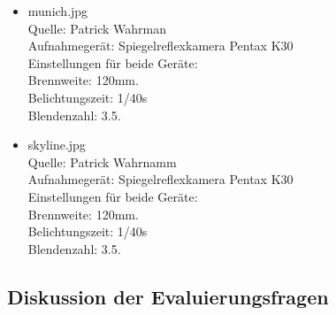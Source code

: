 \documentclass[deutsch]{scrartcl}
\begin{document}
\begin{itemize}
	\item munich.jpg\\
		Quelle: Patrick Wahrman\\
		Aufnahmegerät: Spiegelreflexkamera Pentax K30 \\
		Einstellungen für beide Geräte: \\
		Brennweite: 120mm. \\
		Belichtungszeit: 1/40s \\
		Blendenzahl: 3.5.

	\item skyline.jpg\\
		Quelle: Patrick Wahrnamm\\
		Aufnahmegerät: Spiegelreflexkamera Pentax K30 \\
		Einstellungen für beide Geräte: \\
		Brennweite: 120mm. \\
		Belichtungszeit: 1/40s \\
		Blendenzahl: 3.5.
\end{itemize}

\subsection{Diskussion der Evaluierungsfragen}
\end{document}

